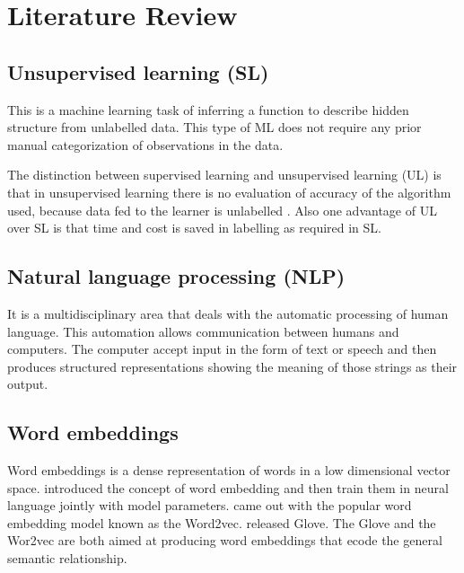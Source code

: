 \chapter{Literature Review}
\section{Unsupervised learning (SL)}
This is a machine learning task of inferring a function to describe hidden structure from unlabelled data. This type of ML does not require any prior manual categorization of observations in the data. 

The distinction between supervised learning and unsupervised learning (UL) is that in unsupervised learning there is no evaluation of accuracy of the algorithm used, because data fed to the learner is unlabelled . Also one advantage of UL over SL is that time and cost is saved in labelling as required in SL. 
\section{Natural language processing (NLP)}
It is a multidisciplinary area that deals with the automatic processing of human language. 
This automation allows communication between humans and computers. The computer accept input in the form of text or speech and then produces structured representations showing the meaning of those strings as their output.



\section{Word embeddings}
Word embeddings is a dense representation of words in a low dimensional vector space. \cite{bengio2003neural} introduced the  concept of word embedding and then train them in neural language jointly with model parameters. \citep{mikolov2013distributed} came out with the popular word embedding model known as the Word2vec. 
\cite{faruqui2014retrofitting} released Glove. The Glove and the Wor2vec are both aimed at producing word embeddings that ecode the general semantic relationship.
